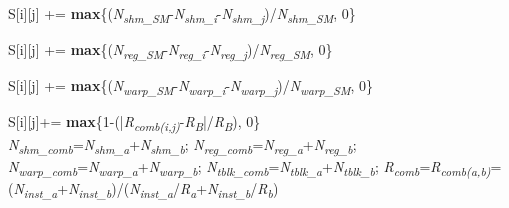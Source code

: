 \documentclass[twocolumn]{el-author}
\begin{document}
\begin{algorithm}
\begin{algorithmic}[5]
		\State S[i][j] += \textbf{max}\{(\emph{N\textsubscript{shm\_SM}}-\emph{N\textsubscript{shm\_i}}-\emph{N\textsubscript{shm\_j}})/\emph{N\textsubscript{shm\_SM}}, 0\}



		\State S[i][j] += \textbf{max}\{(\emph{N\textsubscript{reg\_SM}}-\emph{N\textsubscript{reg\_i}}-\emph{N\textsubscript{reg\_j}})/\emph{N\textsubscript{reg\_SM}}, 0\}



		\State S[i][j] += \textbf{max}\{(\emph{N\textsubscript{warp\_SM}}-\emph{N\textsubscript{warp\_i}}-\emph{N\textsubscript{warp\_j}})/\emph{N\textsubscript{warp\_SM}}, 0\}
	
		
\State S[i][j]+= \textbf{max}\{1-(|\emph{R\textsubscript{comb(i,j)}}-\emph{R\textsubscript{B}}|/\emph{R\textsubscript{B}}), 0\} 
\EndIf
		\EndIf
		\EndFor
		\EndFor
		 \EndFunction
		\vspace{-4.5pt}
		\\\dotfill
		\vspace{-1.5pt}
		\State \emph{N\textsubscript{shm\_comb}}=\emph{N\textsubscript{shm\_a}}+\emph{N\textsubscript{shm\_b}};  \emph{N\textsubscript{reg\_comb}}=\emph{N\textsubscript{reg\_a}}+\emph{N\textsubscript{reg\_b}};  \emph{N\textsubscript{warp\_comb}}=\emph{N\textsubscript{warp\_a}}+\emph{N\textsubscript{warp\_b}};
		\State \emph{N\textsubscript{tblk\_comb}}=\emph{N\textsubscript{tblk\_a}}+\emph{N\textsubscript{tblk\_b}};  \emph{R\textsubscript{comb}}=\emph{R\textsubscript{comb(a,b)}}=(\emph{N\textsubscript{inst\_a}}+\emph{N\textsubscript{inst\_b}})/(\emph{N\textsubscript{inst\_a}}/\emph{R\textsubscript{a}}+\emph{N\textsubscript{inst\_b}}/\emph{R\textsubscript{b}})
		\State {} 
		\EndFunction
	\end{algorithmic}
\end{algorithm}
\end{document}
